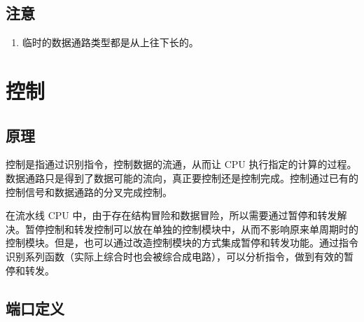 \documentclass[12pt,AutoFakeBold,AutoFakeSlant]{article}
\providecommand{\tightlist}{%
  \setlength{\itemsep}{0pt}\setlength{\parskip}{0pt}}
\begin{document}
\hypertarget{ux6ce8ux610f}{%
\subsection{注意}\label{ux6ce8ux610f}}

\begin{enumerate}
\def\labelenumi{\arabic{enumi}.}
\tightlist
\item
  临时的数据通路类型都是从上往下长的。
\end{enumerate}

\hypertarget{ux63a7ux5236}{%
\section{控制}\label{ux63a7ux5236}}

\hypertarget{ux539fux7406-11}{%
\subsection{原理}\label{ux539fux7406-11}}

控制是指通过识别指令，控制数据的流通，从而让 CPU
执行指定的计算的过程。数据通路只是得到了数据可能的流向，真正要控制还是控制完成。控制通过已有的控制信号和数据通路的分叉完成控制。

在流水线 CPU
中，由于存在结构冒险和数据冒险，所以需要通过暂停和转发解决。暂停控制和转发控制可以放在单独的控制模块中，从而不影响原来单周期时的控制模块。但是，也可以通过改造控制模块的方式集成暂停和转发功能。通过指令识别系列函数（实际上综合时也会被综合成电路），可以分析指令，做到有效的暂停和转发。

\hypertarget{ux7aefux53e3ux5b9aux4e49-9}{%
\subsection{端口定义}\label{ux7aefux53e3ux5b9aux4e49-9}}
\end{document}
